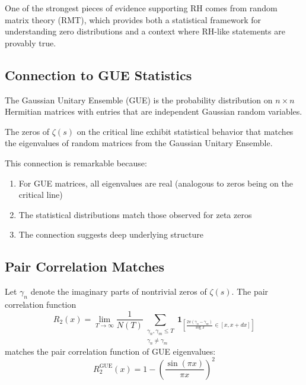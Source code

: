 One of the strongest pieces of evidence supporting RH comes from random matrix theory (RMT), which provides both a statistical framework for understanding zero distributions and a context where RH-like statements are provably true.

\subsection{Connection to GUE Statistics}
\label{subsec:gue_connection}

\begin{definition}
The Gaussian Unitary Ensemble (GUE) is the probability distribution on $n \times n$ Hermitian matrices with entries that are independent Gaussian random variables.
\end{definition}

\begin{theorem}
The zeros of $\zeta(s)$ on the critical line exhibit statistical behavior that matches the eigenvalues of random matrices from the Gaussian Unitary Ensemble.
\end{theorem}

This connection is remarkable because:
\begin{enumerate}
\item For GUE matrices, all eigenvalues are real (analogous to zeros being on the critical line)
\item The statistical distributions match those observed for zeta zeros
\item The connection suggests deep underlying structure
\end{enumerate}

\subsection{Pair Correlation Matches}
\label{subsec:pair_correlation}

\begin{theorem}
Let $\gamma_n$ denote the imaginary parts of nontrivial zeros of $\zeta(s)$. The pair correlation function
\begin{equation}
R_2(x) = \lim_{T \to \infty} \frac{1}{N(T)} \sum_{\substack{\gamma_n, \gamma_m \leq T \\ \gamma_n \neq \gamma_m}} \mathbf{1}_{\left[\frac{2\pi(\gamma_n - \gamma_m)}{\log T} \in [x, x+dx]\right]}
\end{equation}
matches the pair correlation function of GUE eigenvalues:
\begin{equation}
R_2^{\text{GUE}}(x) = 1 - \left(\frac{\sin(\pi x)}{\pi x}\right)^2
\end{equation}
\end{theorem}

